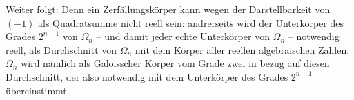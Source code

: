 Weiter folgt:  Denn ein Zerfällungskörper kann wegen der Darstellbarkeit von $(-1)$ als Quadratsumme nicht reell sein: andrerseits wird der Unterkörper des Grades $2^{n-1}$ von $\Omega_n$ -- und damit jeder echte Unterkörper von $\Omega_n$ -- notwendig reell, als Durchschnitt von $\Omega_n$ mit dem Körper aller reellen algebraischen Zahlen. $\Omega_n$ wird nämlich als Galoisscher Körper vom Grade zwei in bezug auf diesen Durchschnitt, der also notwendig mit dem Unterkörper des Grades $2^{n-1}$ übereinstimmt.

